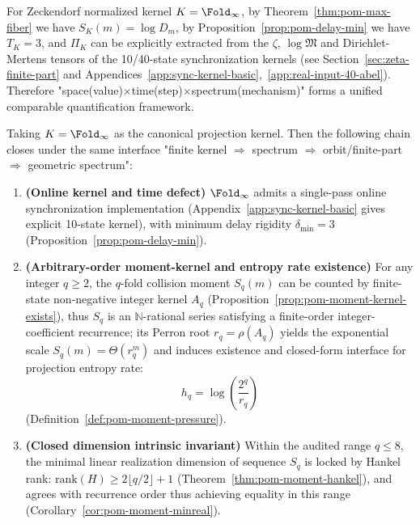 \begin{remark}\label{rem:pom-fold-fingerprint}
For Zeckendorf normalized kernel $K=\Fold_\infty$, by Theorem~\ref{thm:pom-max-fiber} we have $S_K(m)=\log D_m$, by Proposition~\ref{prop:pom-delay-min} we have $T_K=3$, and $\Pi_K$ can be explicitly extracted from the $\zeta$, $\log\mathfrak{M}$ and Dirichlet-Mertens tensors of the 10/40-state synchronization kernels (see Section~\ref{sec:zeta-finite-part} and Appendices~\ref{app:sync-kernel-basic},~\ref{app:real-input-40-abel}). Therefore "space(value)$\times$time(step)$\times$spectrum(mechanism)" forms a unified comparable quantification framework.
\end{remark}

\begin{theorem}\label{thm:pom-unified-closure}
Taking $K=\Fold_\infty$ as the canonical projection kernel. Then the following chain closes under the same interface "finite kernel $\Rightarrow$ spectrum $\Rightarrow$ orbit/finite-part $\Rightarrow$ geometric spectrum":
\begin{enumerate}
  \item \textbf{(Online kernel and time defect)} $\Fold_\infty$ admits a single-pass online synchronization implementation (Appendix~\ref{app:sync-kernel-basic} gives explicit 10-state kernel), with minimum delay rigidity $\delta_{\min}=3$ (Proposition~\ref{prop:pom-delay-min}).
  \item \textbf{(Arbitrary-order moment-kernel and entropy rate existence)} For any integer $q\ge 2$, the $q$-fold collision moment $S_q(m)$ can be counted by finite-state non-negative integer kernel $A_q$ (Proposition~\ref{prop:pom-moment-kernel-exists}), thus $S_q$ is an $\mathbb N$-rational series satisfying a finite-order integer-coefficient recurrence; its Perron root $r_q=\rho(A_q)$ yields the exponential scale $S_q(m)=\Theta(r_q^m)$ and induces existence and closed-form interface for projection entropy rate:
  \[
  h_q=\log\!\left(\frac{2^q}{r_q}\right)
  \]
  (Definition~\ref{def:pom-moment-pressure}).
  \item \textbf{(Closed dimension intrinsic invariant)} Within the audited range $q\le 8$, the minimal linear realization dimension of sequence $S_q$ is locked by Hankel rank: $\mathrm{rank}(H)\ge 2\lfloor q/2\rfloor+1$ (Theorem~\ref{thm:pom-moment-hankel}), and agrees with recurrence order thus achieving equality in this range (Corollary~\ref{cor:pom-moment-minreal}).

\end{enumerate}
\end{theorem}
